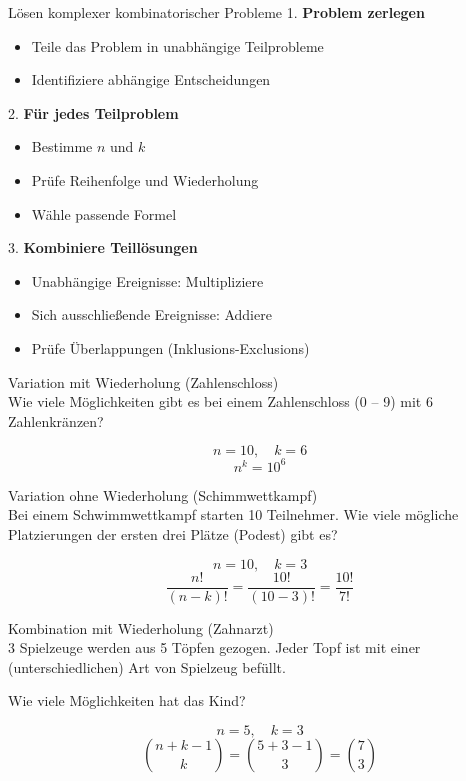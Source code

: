 \begin{KR}{Lösen komplexer kombinatorischer Probleme}
1. \textbf{Problem zerlegen}
   \begin{itemize}
   \item Teile das Problem in unabhängige Teilprobleme
   \item Identifiziere abhängige Entscheidungen
   \end{itemize}

2. \textbf{Für jedes Teilproblem}
   \begin{itemize}
   \item Bestimme $n$ und $k$
   \item Prüfe Reihenfolge und Wiederholung
   \item Wähle passende Formel
   \end{itemize}

3. \textbf{Kombiniere Teillösungen}
   \begin{itemize}
   \item Unabhängige Ereignisse: Multipliziere
   \item Sich ausschließende Ereignisse: Addiere
   \item Prüfe Überlappungen (Inklusions-Exclusions)
   \end{itemize}
\end{KR}

\begin{example}{Variation mit Wiederholung (Zahlenschloss)}\\
Wie viele Möglichkeiten gibt es bei einem Zahlenschloss (0 -- 9) mit 6 Zahlenkränzen?

$$n = 10, \quad k = 6$$
$$n^k = 10^6$$
\end{example}

\begin{example}{Variation ohne Wiederholung (Schimmwettkampf)}\\
Bei einem Schwimmwettkampf starten 10 Teilnehmer. Wie viele mögliche Platzierungen der ersten drei Plätze (Podest) gibt es?

$$n = 10, \quad k = 3$$
$$\frac{n!}{(n-k)!} = \frac{10!}{(10-3)!} = \frac{10!}{7!}$$
\end{example}

\begin{example}{Kombination mit Wiederholung (Zahnarzt)}\\
3 Spielzeuge werden aus 5 Töpfen gezogen. Jeder Topf ist mit einer (unterschiedlichen) Art von Spielzeug befüllt.

Wie viele Möglichkeiten hat das Kind?

$$n = 5, \quad k = 3$$
$$\binom{n+k-1}{k} = \binom{5+3-1}{3} = \binom{7}{3}$$
\end{example}

